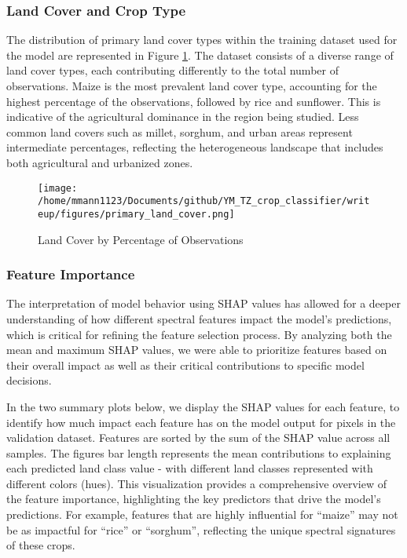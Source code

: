 \documentclass[
]{article}
\begin{document}
\hypertarget{land-cover-and-crop-type}{%
\subsubsection{Land Cover and Crop
Type}\label{land-cover-and-crop-type}}

The distribution of primary land cover types within the training dataset
used for the model are represented in Figure \ref{fig:lc_percentages}.
The dataset consists of a diverse range of land cover types, each
contributing differently to the total number of observations. Maize is
the most prevalent land cover type, accounting for the highest
percentage of the observations, followed by rice and sunflower. This is
indicative of the agricultural dominance in the region being studied.
Less common land covers such as millet, sorghum, and urban areas
represent intermediate percentages, reflecting the heterogeneous
landscape that includes both agricultural and urbanized zones.

\begin{figure}[H]
   \centering   \texttt{[image: /home/mmann1123/Documents/github/YM\_TZ\_crop\_classifier/writeup/figures/primary\_land\_cover.png]} %
   \caption{Land Cover by Percentage of Observations}
   \label{fig:lc_percentages} %
\end{figure}

\hypertarget{feature-importance}{%
\subsubsection{Feature Importance}\label{feature-importance}}

The interpretation of model behavior using SHAP values has allowed for a
deeper understanding of how different spectral features impact the
model's predictions, which is critical for refining the feature
selection process. By analyzing both the mean and maximum SHAP values,
we were able to prioritize features based on their overall impact as
well as their critical contributions to specific model decisions.

In the two summary plots below, we display the SHAP values for each
feature, to identify how much impact each feature has on the model
output for pixels in the validation dataset. Features are sorted by the
sum of the SHAP value across all samples. The figures bar length
represents the mean contributions to explaining each predicted land
class value - with different land classes represented with different
colors (hues). This visualization provides a comprehensive overview of
the feature importance, highlighting the key predictors that drive the
model's predictions. For example, features that are highly influential
for ``maize'' may not be as impactful for ``rice'' or ``sorghum'',
reflecting the unique spectral signatures of these crops.
\end{document}
